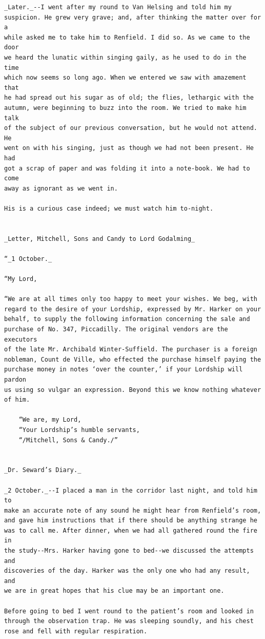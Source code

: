 \documentclass{article}
\begin{document}
\begin{verbatim}
_Later._--I went after my round to Van Helsing and told him my
suspicion. He grew very grave; and, after thinking the matter over for a
while asked me to take him to Renfield. I did so. As we came to the door
we heard the lunatic within singing gaily, as he used to do in the time
which now seems so long ago. When we entered we saw with amazement that
he had spread out his sugar as of old; the flies, lethargic with the
autumn, were beginning to buzz into the room. We tried to make him talk
of the subject of our previous conversation, but he would not attend. He
went on with his singing, just as though we had not been present. He had
got a scrap of paper and was folding it into a note-book. We had to come
away as ignorant as we went in.

His is a curious case indeed; we must watch him to-night.


_Letter, Mitchell, Sons and Candy to Lord Godalming_

“_1 October._

“My Lord,

“We are at all times only too happy to meet your wishes. We beg, with
regard to the desire of your Lordship, expressed by Mr. Harker on your
behalf, to supply the following information concerning the sale and
purchase of No. 347, Piccadilly. The original vendors are the executors
of the late Mr. Archibald Winter-Suffield. The purchaser is a foreign
nobleman, Count de Ville, who effected the purchase himself paying the
purchase money in notes ‘over the counter,’ if your Lordship will pardon
us using so vulgar an expression. Beyond this we know nothing whatever
of him.

    “We are, my Lord,
    “Your Lordship’s humble servants,
    “/Mitchell, Sons & Candy./”


_Dr. Seward’s Diary._

_2 October._--I placed a man in the corridor last night, and told him to
make an accurate note of any sound he might hear from Renfield’s room,
and gave him instructions that if there should be anything strange he
was to call me. After dinner, when we had all gathered round the fire in
the study--Mrs. Harker having gone to bed--we discussed the attempts and
discoveries of the day. Harker was the only one who had any result, and
we are in great hopes that his clue may be an important one.

Before going to bed I went round to the patient’s room and looked in
through the observation trap. He was sleeping soundly, and his chest
rose and fell with regular respiration.


\end{verbatim}
\end{document}
